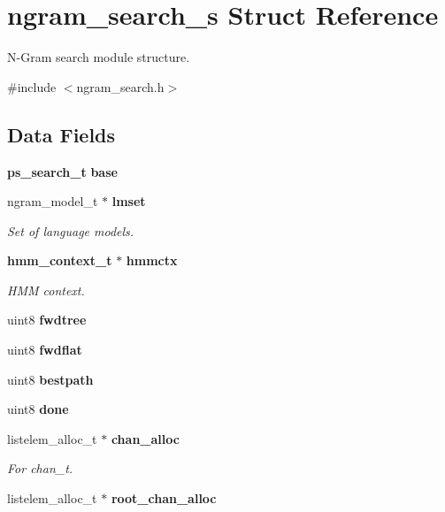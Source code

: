 \section{ngram\+\_\+search\+\_\+s Struct Reference}
\label{structngram__search__s}


N-\/\+Gram search module structure.  




{\ttfamily \#include $<$ngram\+\_\+search.\+h$>$}

\subsection*{Data Fields}
\begin{DoxyCompactItemize}
\item 
{\bf ps\+\_\+search\+\_\+t} {\bfseries base}\label{structngram__search__s_a572ad45de5b0f364096f0a8544fe5bf7}

\item 
ngram\+\_\+model\+\_\+t $\ast$ {\bf lmset}
\begin{DoxyCompactList}\small\item\em Set of language models. \end{DoxyCompactList}\item 
{\bf hmm\+\_\+context\+\_\+t} $\ast$ {\bf hmmctx}
\begin{DoxyCompactList}\small\item\em H\+M\+M context. \end{DoxyCompactList}\item 
uint8 {\bfseries fwdtree}\label{structngram__search__s_aca37c8278a0dacb881cc6a2b0953c076}

\item 
uint8 {\bfseries fwdflat}\label{structngram__search__s_a88358958f4f983c96034cbbd4bc8f5cd}

\item 
uint8 {\bfseries bestpath}\label{structngram__search__s_a0d1daeb151911b2243a1a91566be9063}

\item 
uint8 {\bfseries done}\label{structngram__search__s_a3c51a66cf26de3aa050b3615d14ff060}

\item 
listelem\+\_\+alloc\+\_\+t $\ast$ {\bf chan\+\_\+alloc}\label{structngram__search__s_abe9fe60f6e48b9a6e3d41856bb1dc109}

\begin{DoxyCompactList}\small\item\em For chan\+\_\+t. \end{DoxyCompactList}\item 
listelem\+\_\+alloc\+\_\+t $\ast$ {\bf root\+\_\+chan\+\_\+alloc}\label{structngram__search__s_a576470858bfa44c671f0e677902ab424}


\end{DoxyCompactItemize}
